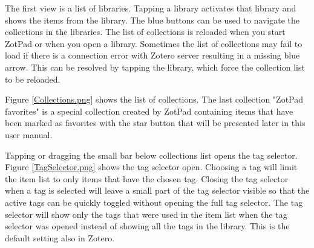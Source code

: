 \documentclass[oneside, openany, 12pt]{tufte-book}
\newcommand{\iphone}[1]{#1}
\newcommand{\ipad}[1]{}
\newcommand{\image}[2]{
	\center
	\fbox{\texttt{[image: images/iPhone/\{\#2]}}}

	\refstepcounter{figure}
	\smallskip\noindent\small Figure \thefigure: #1
	\label{#2}
	}
\newcommand{\ipadfootnote}[1]{}
\newcommand{\iphone}[1]{}
\newcommand{\ipad}[1]{#1}
\newcommand{\image}[2]{
	\caption{#1}
	\label{#2}
	\fbox{\texttt{[image: images/iPad/\{\#2]}}}
	}
\newcommand{\ipadfootnote}[1]{\footnote{#1}}
\begin{document}
\ipad{ZotPad is designed to be used mainly in the landscape orientation. The main screen that is shown in Figure \ref{ItemList.png} consists of the navigator on the left and the content view on the right. In the portrait mode, the navigator is hidden, but can be shown by tapping a button on the top left corner of the content view. 

\begin{figure}
\image{Main user interface}{ItemList.png}
\end{figure}

The bottom of the navigator shows cache status bar. This bar shows the number of items that are are queued for retrieval from the Zotero data server, and the number of files that are queud for downloading and uploading, and the amount of cache space used\ipadfootnote{The item downloads shows the number of toplevel items, attachments, and notes. For example, an article with an attachment and two notes is four items in the counter.}. The download count will decrease when downloads finish and can go up or down when ZotPad adds or cancels downloads based on the libraries, collections, and items that you select. Tapping the gear button will show the ZotPad log and support options, which are described later in the section about troubleshooting and getting help.

Initially the navigator displays the list of libraries that you have access to.} \iphone{The first view is a list of libraries. } Tapping a library activates that library and shows the items from the library\ipad{ as a list in the content view}. The blue buttons can be used to navigate the collections in the libraries. The list of collections is reloaded when you start ZotPad or when you open a library. Sometimes the list of collections may fail to load if there is a connection error with Zotero server resulting in a missing blue arrow. This can be resolved by tapping the library, which force the collection list to be reloaded.

Figure \ref{Collections.png} shows the list of collections. The last collection "ZotPad favorites" is a special collection created by ZotPad containing items that have been marked as favorites with the star button that will be presented later in this user manual.

\begin{figure}
\image{Collections}{Collections.png}
\end{figure}

\clearpage

Tapping or dragging the small bar below collections list opens the tag selector. Figure \ref{TagSelector.png} shows the tag selector open. Choosing a tag will limit the item list to only items that have the chosen tag. Closing the tag selector when a tag is selected will leave a small part of the tag selector visible so that the active tags can be quickly toggled without opening the full tag selector. The tag selector will show only the tags that were used in the item list when the tag selector was opened instead of showing all the tags in the library. This is the default setting also in Zotero.
\end{document}
